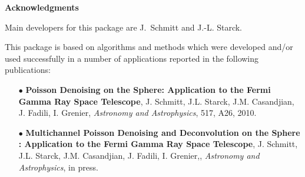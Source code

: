 
\newpage
\thispagestyle{empty}
$ $
\newpage

{\Huge \bf Acknowledgments}\label{forewd}\\
\vspace{1cm}

Main developers for this package are  J.~Schmitt and  J.-L. Starck.
 
This package is based on algorithms and methods which were 
developed and/or used successfully in a number of applications 
reported in the following publications: \\
\begin{itemize}
\item[$\bullet$] {\textbf{Poisson Denoising on the Sphere: Application to the Fermi Gamma Ray Space Telescope},   J. Schmitt, J.L. Starck, J.M. Casandjian, J. Fadili, I. Grenier, \textit{Astronomy and Astrophysics},  517, A26, 2010.}
\item[$\bullet$] {\textbf{Multichannel Poisson Denoising and Deconvolution on the Sphere : Application to the Fermi Gamma Ray Space Telescope}, J. Schmitt, J.L. Starck, J.M. Casandjian, J. Fadili, I. Grenier,, \textit{Astronomy and Astrophysics}, in press.}
\end{itemize}

\newpage
\thispagestyle{empty}
$ $
\newpage

 